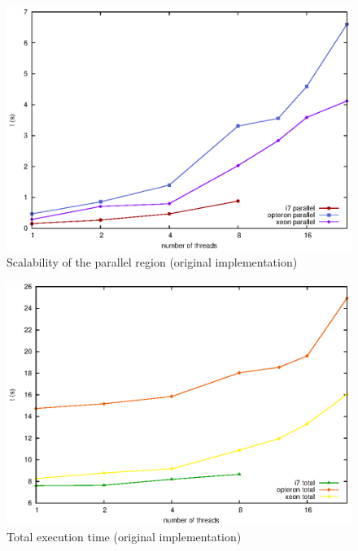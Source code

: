 \documentclass{beamer}
\begin{document}
\begin{frame}[fragile]
	
	\begin{figure}[!htp]
    \centering
    \begin{minipage}[t]{\columnwidth}
        \includegraphics[width=\textwidth]{images/parallel.eps}
        \caption{Scalability of the parallel region (original implementation)}
    \end{minipage}
\end{figure}

\end{frame}

\begin{frame}[fragile]
	
	\begin{figure}[!htp]
    \centering
    \begin{minipage}[t]{\columnwidth}
        \includegraphics[width=\textwidth]{images/total.eps}
        \caption{Total execution time (original implementation)}
    \end{minipage}
\end{figure}

\end{frame}
\end{document}
